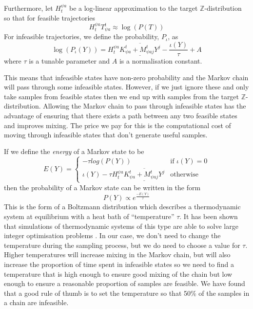 \documentclass{article}
\begin{document}
Furthermore, let $H_t^{\psi a}$ be a log-linear approximation to the target $\mathbb{Z}$-distribution so that for feasible trajectories
\[
H_t^{\psi a}T^t_{\psi a} \approx \log(P(T))
\]
For infeasible trajectories, we define the probability, $P_\iota$, as
\begin{equation}
\log(P_\iota(Y)) = H_t^{\psi a}\overline{\underline{K^t_{\psi a}+M^{t}_{\psi aj}Y^j}} - \frac{\iota(Y)}{\tau} + A
\label{loglinprob}
\end{equation}
where $\tau$ is a tunable parameter and $A$ is a normalisation constant.

This means that infeasible states have non-zero probability and the Markov chain will pass through some infeasible states.  However, if we just ignore these and only take samples from feasible states then we end up with samples from the target $\mathbb{Z}$-distribution. Allowing the Markov chain to pass through infeasible states has the advantage of ensuring that there exists a path between any two feasible states and improves mixing. The price we pay for this is the computational cost of moving through infeasible states that don't generate useful samples.

If we define the \textit{energy} of a Markov state to be
\[
E(Y) =
\begin{cases}
-\tau log(P(Y)) & \text{if }  \iota(Y) = 0\\
\iota(Y) - \tau H_t^{\psi a}\overline{\underline{K^t_{\psi a}+M^{t}_{\psi aj}Y^j}} & \text{otherwise}
\end{cases}
\]
then the probability of a Markov state can be written in the form
\begin{equation}
P(Y) \propto e^{\frac{-E(Y)}{\tau}}
\end{equation}
This is the form of a Boltzmann distribution which describes a thermodynamic system at equilibrium with a heat bath of ``temperature'' $\tau$. It has been shown that simulations of thermodynamic systems of this type are able to solve large integer optimisation problems \cite{kirkpatrick1983optimization}. In our case, we don't need to change the temperature during the sampling process, but we do need to choose a value for $\tau$. Higher temperatures will increase mixing in the Markov chain, but will also increase the proportion of time spent in infeasible states so we need to find a temperature that is high enough to ensure good mixing of the chain but low enough to ensure a reasonable proportion of samples are feasible. We have found that a good rule of thumb is to set the temperature so that 50\% of the samples in a chain are infeasible.
\end{document}
